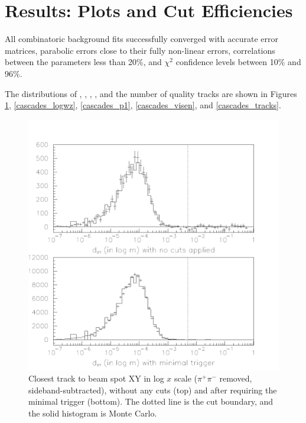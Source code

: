 \section{Results: Plots and Cut Efficiencies}

All combinatoric background fits successfully converged with accurate
error matrices, parabolic errors close to their fully non-linear
errors, correlations between the parameters less than 20\%, and
$\chi^2$ confidence levels between 10\% and 96\%.

The distributions of \dxy, \dz, \pone, \visen, and the number of
quality tracks are shown in Figures \ref{cascades_logd0close},
\ref{cascades_logwz}, \ref{cascades_p1}, \ref{cascades_visen}, and
\ref{cascades_tracks}.

\begin{figure}[p]
  \includegraphics[width=\linewidth]{plots/cascades_logd0close}
  \caption{\label{cascades_logd0close} Closest track to beam spot XY
  in log $x$ scale ($\pi^+\pi^-$ removed, sideband-subtracted),
  without any cuts (top) and after requiring the minimal trigger
  (bottom).  The dotted line is the cut boundary, and the solid
  histogram is Monte Carlo.}
\end{figure}

